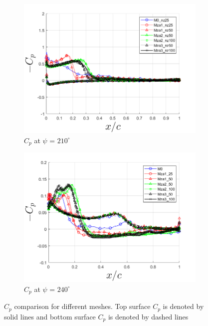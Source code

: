 \begin{figure}[H]
\begin{subfigure}[b]{0.475\textwidth}
\centering
\includegraphics[width=1\textwidth]{figures/zonal_adapt_results/Cp/phase_210.png}
\caption{ $C_p$ at $\psi$ = $210^\circ$}
\label{fig:zonal_Cp_210}
\end{subfigure}
\begin{subfigure}[b]{0.475\textwidth}
\centering
\includegraphics[width=1\textwidth]{figures/zonal_adapt_results/Cp/phase_240.png}
\caption{ $C_p$ at $\psi$ = $240^\circ$}
\label{fig:zonal_Cp_240}
\end{subfigure}
\caption{$C_p$ comparison for different meshes. Top surface $C_p$ is denoted by solid lines and bottom surface $C_p$ is denoted by dashed lines}
\label{fig:zonal_Cp_plots_LEV}
\end{figure}

